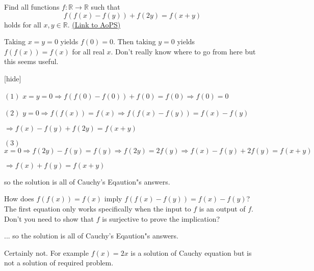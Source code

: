 \begin{problem}
	Find all functions $f:\mathbb R  \rightarrow \mathbb R$ such that
\[f(f(x)-f(y))+f(2y)=f(x+y)\]
holds for all $x,y \in \mathbb R$.
	\flushright \href{https://artofproblemsolving.com/community/c6h615394}{(Link to AoPS)}
\end{problem}



\begin{solution}

Taking $x=y=0$ yields $f(0) = 0$. Then taking $y = 0$ yields $f(f(x)) = f(x)$ for all real $x$. Don't really know where to go from here but this seems useful.

[\/hide]
\end{solution}



\begin{solution}
	$(1)$  $x=y=0 \Rightarrow f(f(0)-f(0))+f(0)=f(0) \Rightarrow f(0)=0$

$(2)$  $y=0 \Rightarrow f(f(x))=f(x) \Rightarrow f(f(x)-f(y))=f(x)-f(y)$ 

$\Rightarrow f(x)-f(y)+f(2y)=f(x+y)$ 

$(3)$  $x=0 \Rightarrow f(2y)-f(y)=f(y) \Rightarrow f(2y)=2f(y) \Rightarrow f(x)-f(y)+2f(y)=f(x+y)$ 

$\Rightarrow f(x)+f(y)=f(x+y)$


so the solution is all of Cauchy's Eqaution"s answers.
\end{solution}



\begin{solution}
	How does $f(f(x)) = f(x)$ imply $f(f(x)-f(y)) = f(x)-f(y)$? The first equation only works specifically when the input to $f$ is an output of $f$. Don't you need to show that $f$ is surjective to prove the implication?
\end{solution}



\begin{solution}
	\begin{tcolorbox}...
so the solution is all of Cauchy's Eqaution"s answers.\end{tcolorbox}
Certainly not. For example $f(x)=2x$ is a solution of Cauchy equation but is not a solution of required problem.
\end{solution}




